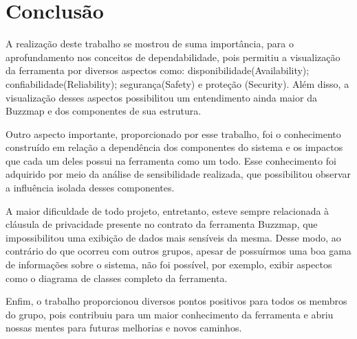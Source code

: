\section{Conclusão}

A realização deste trabalho se mostrou de suma importância, para o
aprofundamento nos conceitos de dependabilidade, pois permitiu a visualização
da ferramenta por diversos aspectos como: disponibilidade(Availability); confiabilidade(Reliability);
segurança(Safety) e proteção (Security). Além disso, a visualização desses aspectos
possibilitou um entendimento ainda maior da Buzzmap e dos
componentes de sua estrutura.

Outro aspecto importante, proporcionado por esse trabalho, foi o conhecimento
construído em relação a dependência dos componentes do sistema e os impactos
que cada um deles possui na ferramenta como um todo. Esse conhecimento foi
adquirido por meio da análise de sensibilidade realizada, que possibilitou
observar a influência isolada desses componentes. 

A maior dificuldade de todo projeto, entretanto, esteve sempre relacionada à
cláusula de privacidade presente no contrato da ferramenta Buzzmap, que
impossibilitou uma exibição de dados mais sensíveis da mesma. Desse modo, ao
contrário do que ocorreu com outros grupos, apesar de possuírmos uma boa gama
de informações sobre o sistema, não foi possível, por exemplo, exibir aspectos
como o diagrama de classes completo da ferramenta.

Enfim, o trabalho proporcionou diversos pontos positivos para todos os membros
do grupo, pois contribuiu para um maior conhecimento da ferramenta e abriu
nossas mentes para futuras melhorias e novos caminhos.

